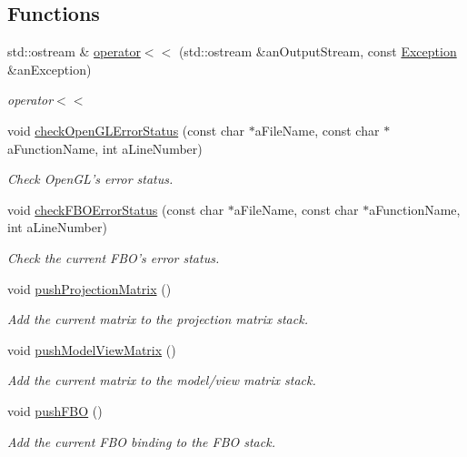 \subsection*{Functions}
\begin{DoxyCompactItemize}
\item 
std::ostream \& \hyperlink{namespace_utilities_a1b36a6b137d8abe02a7f79072473e3b4}{operator$<$$<$} (std::ostream \&anOutputStream, const \hyperlink{class_utilities_1_1_exception}{Exception} \&anException)
\begin{DoxyCompactList}\small\item\em operator$<$$<$ \end{DoxyCompactList}\item 
void \hyperlink{namespace_utilities_ac80bf2d2d0e6f362b9fa305c6329d4dd}{checkOpenGLErrorStatus} (const char $\ast$aFileName, const char $\ast$aFunctionName, int aLineNumber)
\begin{DoxyCompactList}\small\item\em Check OpenGL's error status. \end{DoxyCompactList}\item 
void \hyperlink{namespace_utilities_aa6d370633a054fc0d3867e172c410b8f}{checkFBOErrorStatus} (const char $\ast$aFileName, const char $\ast$aFunctionName, int aLineNumber)
\begin{DoxyCompactList}\small\item\em Check the current FBO's error status. \end{DoxyCompactList}\item 
void \hyperlink{namespace_utilities_a4ff1a91f49f45940ef3fe39374d6fad3}{pushProjectionMatrix} ()
\begin{DoxyCompactList}\small\item\em Add the current matrix to the projection matrix stack. \end{DoxyCompactList}\item 
void \hyperlink{namespace_utilities_a759523b332a302b032d7e1dbe3d70589}{pushModelViewMatrix} ()
\begin{DoxyCompactList}\small\item\em Add the current matrix to the model/view matrix stack. \end{DoxyCompactList}\item 
void \hyperlink{namespace_utilities_a4d73d1a6deada0aace5a5fb250971aa1}{pushFBO} ()
\begin{DoxyCompactList}\small\item\em Add the current FBO binding to the FBO stack. \end{DoxyCompactList}\item 

\end{DoxyCompactItemize}
